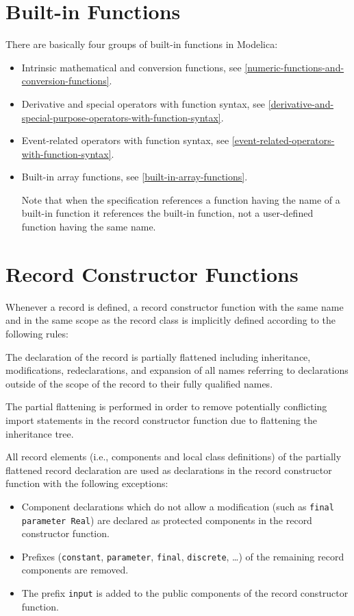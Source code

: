 \section{Built-in Functions}

There are basically four groups of built-in functions in Modelica:
\begin{itemize}
\item
  Intrinsic mathematical and conversion functions, see \autoref{numeric-functions-and-conversion-functions}.
\item
  Derivative and special operators with function syntax,
  see \autoref{derivative-and-special-purpose-operators-with-function-syntax}.
\item
  Event-related operators with function syntax, see \autoref{event-related-operators-with-function-syntax}.
\item
  Built-in array functions, see \autoref{built-in-array-functions}.

  Note that when the specification references a function having the name
  of a built-in function it references the built-in function, not a
  user-defined function having the same name.
\end{itemize}

\section{Record Constructor Functions}

Whenever a record is defined, a record constructor function with the
same name and in the same scope as the record class is implicitly
defined according to the following rules:

The declaration of the record is partially flattened including
inheritance, modifications, redeclarations, and expansion of all names
referring to declarations outside of the scope of the record to their
fully qualified names.

\begin{nonnormative}
The partial flattening is performed in order to remove potentially conflicting import statements in the record constructor function due to flattening the inheritance tree.
\end{nonnormative}

All record elements (i.e., components and local class
definitions) of the partially flattened record declaration are used
as declarations in the record constructor function with the following
exceptions:
\begin{itemize}
\item
  Component declarations which do not allow a modification (such
  as \lstinline!final parameter Real!) are declared
  as protected components in the record constructor function.
\item
  Prefixes (\lstinline!constant!, \lstinline!parameter!, \lstinline!final!, \lstinline!discrete!, \ldots) of the remaining
  record components are removed.
\item
  The prefix \lstinline!input! is added to the public components of the record
  constructor function.
\end{itemize}

